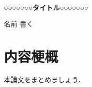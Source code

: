 ﻿%

\begin{center}
  \large\bf ○○○○○○○タイトル○○○○○○○
\end{center}
\begin{flushright}
名前 書く
\end{flushright}

\vspace*{-12mm}
\section*{\normalsize 内容梗概}
本論文をまとめましょう．

